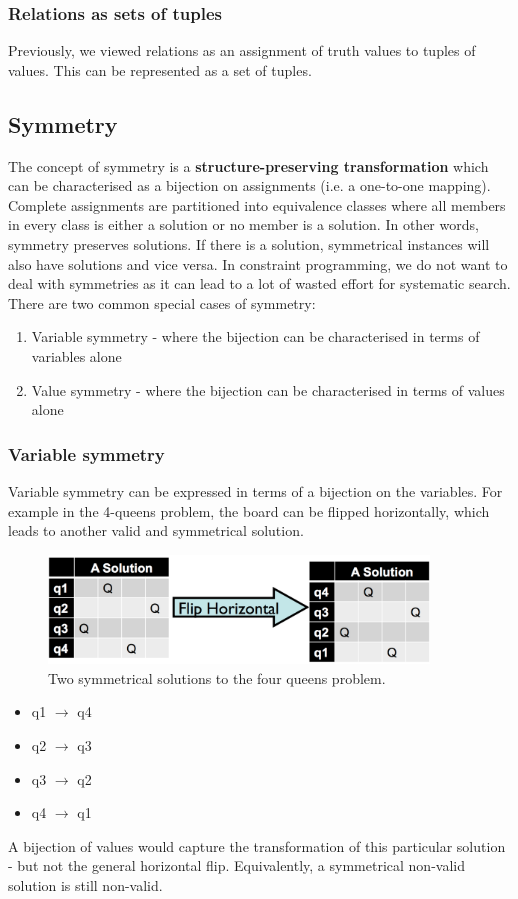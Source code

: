 \documentclass[CS4402-Notes.tex]{subfiles}
\begin{document}
\subsubsection{Relations as sets of tuples}
Previously, we viewed relations as an assignment of truth values to tuples of values. This can be represented as a set of tuples.

\subsection{Symmetry}
The concept of symmetry is a \textbf{structure-preserving transformation} which can be characterised as a bijection on assignments (i.e. a one-to-one mapping). Complete assignments are partitioned into equivalence classes where all members in every class is either a solution or no member is a solution. In other words, symmetry preserves solutions. If there is a solution, symmetrical instances will also have solutions and vice versa.
\n
In constraint programming, we do not want to deal with symmetries as it can lead to a lot of wasted effort for systematic search. There are two common special cases of symmetry:
\begin{enumerate}
\item Variable symmetry - where the bijection can be characterised in terms of variables alone
\item Value symmetry - where the bijection can be characterised in terms of values alone
\end{enumerate}

\subsubsection{Variable symmetry}
Variable symmetry can be expressed in terms of a bijection on the variables. For example in the 4-queens problem, the board can be flipped horizontally, which leads to another valid and symmetrical solution.
\begin{figure}[H]
  \centering
  \includegraphics[width=0.9\textwidth, keepaspectratio]{imgs/4-queens-symmetry.png}
  \caption{Two symmetrical solutions to the four queens problem.}
\end{figure}
\begin{itemize}
\item q1 $\rightarrow$ q4
\item q2 $\rightarrow$ q3
\item q3 $\rightarrow$ q2
\item q4 $\rightarrow$ q1
\end{itemize}
A bijection of values would capture the transformation of this particular solution - but not the general horizontal flip. Equivalently, a symmetrical non-valid solution is still non-valid.
\end{document}
